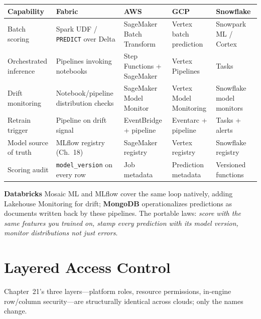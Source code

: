 \begin{center}
\footnotesize
\begin{tabular}{@{}p{2.8cm}p{3.2cm}p{3.2cm}p{3.2cm}p{3.2cm}@{}}
\toprule
\textbf{Capability} & \textbf{Fabric} & \textbf{AWS} & \textbf{GCP} & \textbf{Snowflake} \\
\midrule
Batch scoring & Spark UDF / \texttt{PREDICT} over Delta & SageMaker Batch Transform & Vertex batch prediction & Snowpark ML / Cortex \\
Orchestrated inference & Pipelines invoking notebooks & Step Functions + SageMaker & Vertex Pipelines & Tasks \\
Drift monitoring & Notebook/pipeline distribution checks & SageMaker Model Monitor & Vertex Model Monitoring & Snowflake model monitors \\
Retrain trigger & Pipeline on drift signal & EventBridge + pipeline & Eventarc + pipeline & Tasks + alerts \\
Model source of truth & MLflow registry (Ch.~18) & SageMaker registry & Vertex registry & Snowflake registry \\
Scoring audit & \texttt{model\_version} on every row & Job metadata & Prediction metadata & Versioned functions \\
\bottomrule
\end{tabular}
\end{center}

\noindent \textbf{Databricks} Mosaic ML and MLflow cover the same loop natively, adding
Lakehouse Monitoring for drift; \textbf{MongoDB} operationalizes predictions as documents
written back by these pipelines. The portable laws: \emph{score with the same features you
trained on, stamp every prediction with its model version, monitor distributions not just
errors}.

\section{Layered Access Control}
%
Chapter~21's three layers---platform roles, resource permissions, in-engine row/column
security---are structurally identical across clouds; only the names change.

